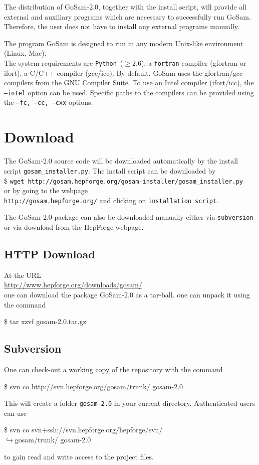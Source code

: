 \documentclass[11pt,a4paper]{refrep}
\newcommand{\gosamversion}{{2{.}0}}
\newcommand{\gosam}{{\sc GoSam}\xspace}
\newcommand{\packagename}{{gosam-\gosamversion}}
\newcommand{\python}{{\tt Python}\xspace}
\newcommand{\contl}{{\ensuremath{\hookrightarrow}}}
\begin{document}
The distribution of \gosam-\gosamversion{}, together with the install script, 
will provide all external and auxiliary programs which are necessary 
to successfully run \gosam. 
Therefore, the user does not have to install any external programs manually.

The program \gosam is designed to run in any modern Unix-like environment (Linux, Mac).\\
The system requirements are
\python~($\geq2.6$), 
a {\tt fortran} compiler (gfortran or ifort), 
a C/C++ compiler (gcc/icc). 
By default, \gosam uses the gfortran/gcc  compilers from the GNU Compiler Suite.
To use an Intel compiler  (ifort/icc), the {\tt --intel} option can be used.
Specific paths to the compilers can be provided using the {\tt --fc, --cc, --cxx}  options.


\section{Download}

The \gosam-\gosamversion{} source code 
will be downloaded automatically by the install script {\tt gosam\_installer.py}. 
The install script can be downloaded by \\
{\$  \tt wget http://gosam.hepforge.org/gosam-installer/gosam\_installer.py}\\
or by going to the webpage \\
{\tt http://gosam.hepforge.org/}
and clicking on {\tt installation script}.



The \gosam-\gosamversion{} package can also be downloaded 
manually either via \texttt{subversion}
or via  download from the {\sc HepForge} webpage.

\subsection*{HTTP Download}
At the URL \\
\url{http://www.hepforge.org/downloads/gosam/}\\
one can download the package
\gosam-\gosamversion{}  as a tar-ball. 
one can unpack it using the command
\begin{example}
\$ tar xzvf \packagename{}.tar.gz
\end{example}

\subsection*{Subversion}
One can check-out a working copy of the repository with the command
\begin{example}
\$ svn co http://svn.hepforge.org/gosam/trunk/ gosam-\gosamversion{}
\end{example}
This will create a folder \texttt{gosam-\gosamversion} in your current directory.
Authenticated users can use 
\begin{example}
\$ svn co svn+ssh://svn.hepforge.org/hepforge/svn/\\
   \contl{}gosam/trunk/ gosam-\gosamversion{}
\end{example}
to gain read and write access to the project files.
\end{document}
